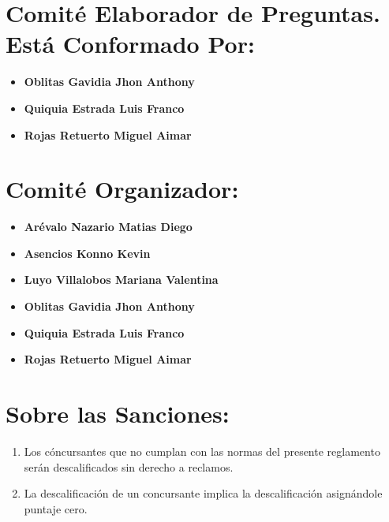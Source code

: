 \documentclass{article}
\begin{document}
\begin{itemize}
          \section{Comité Elaborador de Preguntas. Está Conformado Por:}
          \begin{itemize}
              \item \textbf{Oblitas Gavidia Jhon Anthony}
              \item \textbf{Quiquia Estrada Luis Franco}
              \item \textbf{Rojas Retuerto Miguel Aimar}
          \end{itemize}
          \section{Comité Organizador:}
          \begin{itemize}
              \item \textbf{Arévalo Nazario Matias Diego}
              \item \textbf{Asencios Konno Kevin}
              \item \textbf{Luyo Villalobos Mariana Valentina}
              \item \textbf{Oblitas Gavidia Jhon Anthony}
              \item \textbf{Quiquia Estrada Luis Franco}
              \item \textbf{Rojas Retuerto Miguel Aimar}
          \end{itemize}
          \section{Sobre las Sanciones:}
          \begin{enumerate}
              \item Los cóncursantes que no cumplan con las normas del presente reglamento
                    serán descalificados sin derecho a reclamos.
              \item La descalificación de un concursante implica la descalificación asignándole
                    puntaje cero.
          \end{enumerate}

\end{itemize}
\end{document}
